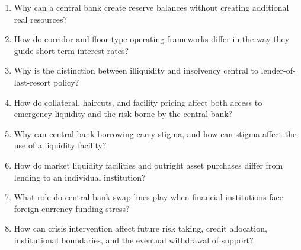 \begin{enumerate}

\item Why can a central bank create reserve balances without creating additional real resources?

\item How do corridor and floor-type operating frameworks differ in the way they guide short-term interest rates?

\item Why is the distinction between illiquidity and insolvency central to lender-of-last-resort policy?

\item How do collateral, haircuts, and facility pricing affect both access to emergency liquidity and the risk borne by the central bank?

\item Why can central-bank borrowing carry stigma, and how can stigma affect the use of a liquidity facility?

\item How do market liquidity facilities and outright asset purchases differ from lending to an individual institution?

\item What role do central-bank swap lines play when financial institutions face foreign-currency funding stress?

\item How can crisis intervention affect future risk taking, credit allocation, institutional boundaries, and the eventual withdrawal of support?

\end{enumerate}





